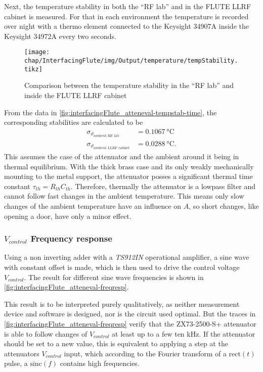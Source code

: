 Next, the temperature stability in both the ``RF lab'' and in the FLUTE LLRF cabinet is measured. For that in each environment the temperature is recorded over night with a thermo element connected to the Keysight 34907A inside the Keysight 34972A every two seconds.

\begin{figure}[tb]
	\centering
	\texttt{[image: chap/InterfacingFlute/img/Output/temperature/tempStability.tikz]}
	\caption{Comparison between the temperature stability in the ``RF lab'' and inside the FLUTE LLRF cabinet}
	\label{fig:interfacingFlute_atteneval-tempstab-time}
\end{figure}

From the data in \autoref{fig:interfacingFlute_atteneval-tempstab-time}, the corresponding stabilities are calculated to be
\begin{align}
\sigma_{\vartheta_{ambient, \text{RF lab}}}       &= \SI{0.1067}{\celsius}\\
\sigma_{\vartheta_{ambient, \text{LLRF cabinet}}} &= \SI{0.0288}{\celsius}.
\end{align}
This assumes the case of the attenuator and the ambient around it being in thermal equilibrium. With the thick brass case and its only weakly mechanically mounting to the metal support, the attenuator posses a significant thermal time constant $\tau_{th}=R_{th}C_{th}$. Therefore, thermally the attenuator is a lowpass filter and cannot follow fast changes in the ambient temperature.
This means only slow changes of the ambient temperature have an influence on $A$, so short changes, like opening a door, have only a minor effect.

\subsubsection{$V_{control}$ Frequency response}\label{sec:interfacingFlute_freqr}
Using a non inverting adder with a \textit{TS912IN} operational amplifier, a sine wave with constant offset is made, which is then used to drive the control voltage $V_{control}$. The result for different sine wave frequencies is shown in \autoref{fig:interfacingFlute_atteneval-freqresp}.

This result is to be interpreted purely qualitatively, as neither measurement device and software is designed, nor is the circuit used optimal.
But the traces in \autoref{fig:interfacingFlute_atteneval-freqresp} verify that the ZX73-2500-S+ attenuator is able to follow changes of $V_{control}$ at least up to a few ten \si{\kHz}. If the attenuator should be set to a new value, this is equivalent to applying a step at the attenuators $V_{control}$ input, which according to the Fourier transform of a $\text{rect}(t)$ pulse, a $\text{sinc}(f)$ contains high frequencies.

